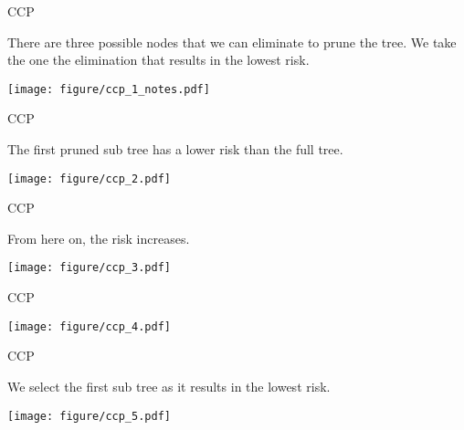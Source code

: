 \documentclass[11pt,compress,t,notes=noshow, xcolor=table]{beamer}
\begin{document}
\begin{frame}[noframenumbering]{CCP}

There are three possible nodes that we can eliminate to prune the tree.
We take the one the elimination that results in the lowest risk.

\vspace{0.25cm}

\color{fgcolor}

{\centering \texttt{[image: figure/ccp\_1\_notes.pdf]} 

}

\end{frame}

\begin{frame}[noframenumbering]{CCP}


The first pruned sub tree has a lower risk than the full tree.
\vspace{0.25cm}

{\centering \texttt{[image: figure/ccp\_2.pdf]} 

}

\end{frame}

\begin{frame}[noframenumbering]{CCP}

From here on, the risk increases.
\vspace{0.25cm}


{\centering \texttt{[image: figure/ccp\_3.pdf]} 

}

\end{frame}

\begin{frame}[noframenumbering]{CCP}


{\centering \texttt{[image: figure/ccp\_4.pdf]} 

}


\end{frame}

\begin{frame}[noframenumbering]{CCP}

We select the first sub tree as it results in the lowest risk.
\vspace{0.25cm}


{\centering \texttt{[image: figure/ccp\_5.pdf]} 

}


\end{frame}



\endlecture
\end{document}

